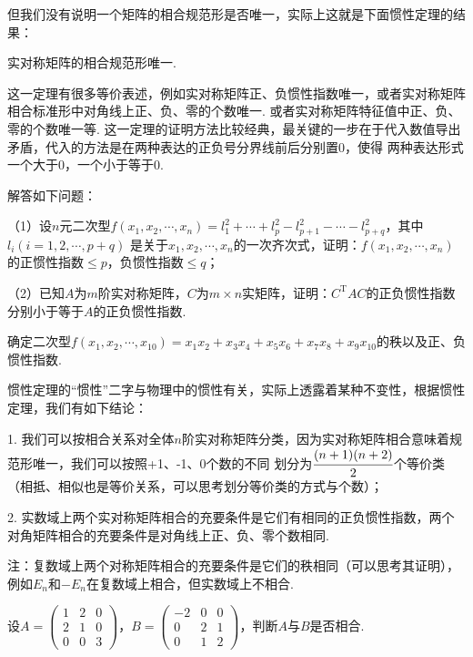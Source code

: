 但我们没有说明一个矩阵的相合规范形是否唯一，实际上这就是下面惯性定理的结果：
\begin{theorem}
	实对称矩阵的相合规范形唯一.
\end{theorem}
这一定理有很多等价表述，例如实对称矩阵正、负惯性指数唯一，或者实对称矩阵相合标准形中对角线上正、负、零的个数唯一.
或者实对称矩阵特征值中正、负、零的个数唯一等.
这一定理的证明方法比较经典，最关键的一步在于代入数值导出矛盾，代入的方法是在两种表达的正负号分界线前后分别置0，使得
两种表达形式一个大于0，一个小于等于0.
\begin{example}
	解答如下问题：

	\textup{（1）}设$n$元二次型$f(x_1,x_2,\cdots,x_n)=l_1^2+\cdots+l_p^2-l_{p+1}^2-\cdots-l_{p+q}^2$，其中$l_i(i=1,2,\cdots,p+q)$
	是关于$x_1,x_2,\cdots,x_n$的一次齐次式，证明：$f(x_1,x_2,\cdots,x_n)$的正惯性指数$\le p$，负惯性指数$\le q$\textup{；}
	
	\textup{（2）}已知$A$为$m$阶实对称矩阵，$C$为$m\times n$实矩阵，证明：$C^\mathrm{T}AC$的正负惯性指数
	分别小于等于$A$的正负惯性指数.
\end{example}
\begin{example}
	确定二次型$f(x_1,x_2,\cdots,x_{10})=x_1x_2+x_3x_4+x_5x_6+x_7x_8+x_9x_{10}$的秩以及正、负惯性指数.
\end{example}
惯性定理的“惯性”二字与物理中的惯性有关，实际上透露着某种不变性，根据惯性定理，我们有如下结论：

1. 我们可以按相合关系对全体$n$阶实对称矩阵分类，因为实对称矩阵相合意味着规范形唯一，我们可以按照+1、-1、0个数的不同
划分为$\cfrac{(n+1)(n+2)}{2}$个等价类（相抵、相似也是等价关系，可以思考划分等价类的方式与个数）；

2. 实数域上两个实对称矩阵相合的充要条件是它们有相同的正负惯性指数，两个对角矩阵相合的充要条件是对角线上正、负、零个数相同.

注：复数域上两个对称矩阵相合的充要条件是它们的秩相同（可以思考其证明），例如$E_n$和$-E_n$在复数域上相合，但实数域上不相合.
\begin{example}
	设$A=\begin{pmatrix}
		1 & 2 & 0 \\ 2 & 1 & 0 \\ 0 & 0 & 3
	\end{pmatrix}$，$B=\begin{pmatrix}
		-2 & 0 & 0 \\ 0 & 2 & 1 \\ 0 & 1 & 2
	\end{pmatrix}$，判断$A$与$B$是否相合.
\end{example}

